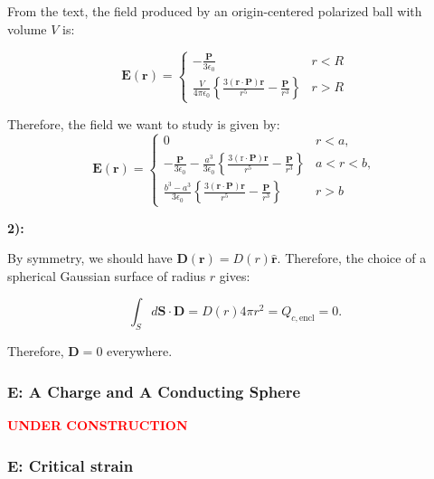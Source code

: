 From the text, the field produced by an origin-centered polarized ball with volume $V$ is:
	
\begin{equation}
	\mathbf{E}(\mathbf{r})=\left\{\begin{array}{ll}-\frac{\mathbf{P}}{3 \epsilon_{0}} & r<R \\
	\frac{V}{4 \pi \epsilon_{0}}\left\{\frac{3(\mathbf{r} \cdot \mathbf{P}) \mathbf{r}}{r^{5}}-\frac{\mathbf{P}}{r^{3}}\right\} & r>R
	\end{array}\right.
\end{equation}

Therefore, the field we want to study is given by:
\begin{equation}
	\mathbf{E}(\mathbf{r})=\left\{\begin{array}{ll}
		0 \quad & r<a, \\
		-\frac{\mathbf{P}}{3 \epsilon_{0}}-\frac{a^{3}}{3 \epsilon_{0}}\left\{\frac{3(\mathrm{r} \cdot \mathbf{P}) \mathbf{r}}{r^{5}}-\frac{\mathbf{P}}{r^{3}}\right\} & a<r<b, \\
		\frac{b^{3}-a^{3}}{3 \epsilon_{0}}\left\{\frac{3(\mathbf{r} \cdot \mathbf{P}) \mathbf{r}}{r^{5}}-\frac{\mathbf{P}}{r^{3}}\right\} & r>b
	\end{array}\right.
\end{equation}

\textbf{2):}

By symmetry, we should have $\mathbf{D}(\mathbf{r})=D(r) \hat{\mathbf{r}}$. Therefore, the choice of a spherical Gaussian surface of radius $r$ gives:

\begin{equation}
	\int_{S} d \mathbf{S} \cdot \mathbf{D}=D(r) 4 \pi r^{2}=Q_{c, \text{encl}}=0.
\end{equation}

Therefore, $\mathbf{D}=0$ everywhere.
	


\subsubsection{E: A Charge and A Conducting Sphere}\label{E: A Charge and A Conducting Sphere}
\textbf{\textcolor{red}{UNDER CONSTRUCTION}}

\subsubsection{E: Critical strain}\label{E: Critical strain}

